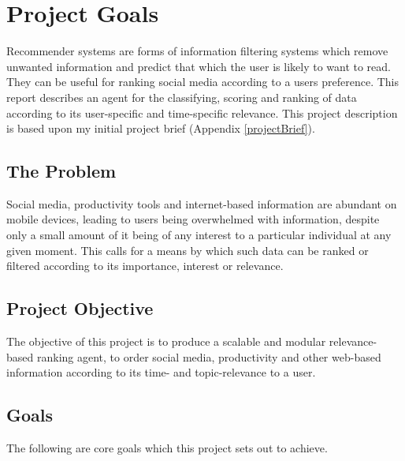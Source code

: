 \chapter{Project Goals}

Recommender systems are forms of information filtering systems which remove unwanted information and predict that which the user is likely to want to read. They can be useful for ranking social media according to a users preference. This report describes an agent for the classifying, scoring and ranking of data according to its user-specific and time-specific relevance. This project description is based upon my initial project brief (Appendix \ref{projectBrief}).

\section{The Problem}

Social media, productivity tools and internet-based information are abundant on mobile devices, leading to users being overwhelmed with information, despite only a small amount of it being of any interest to a particular individual at any given moment. This calls for a means by which such data can be ranked or filtered according to its importance, interest or relevance.

\section{Project Objective}

The objective of this project is to produce a scalable and modular relevance-based ranking agent, to order social media, productivity and other web-based information according to its time- and topic-relevance to a user.

\section{Goals}

The following are core goals which this project sets out to achieve.

